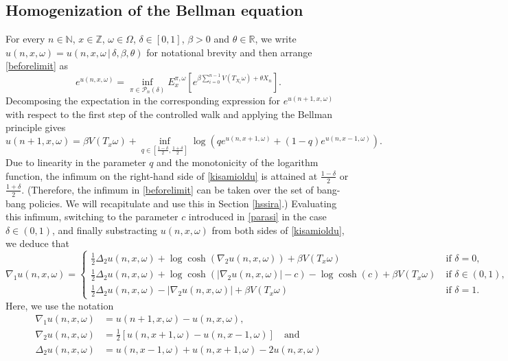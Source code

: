 \documentclass[a4paper]{amsart}
\numberwithin{equation}{section}
\theoremstyle{plain}
\theoremstyle{remark}
\begin{document}
\subsection{Homogenization of the Bellman equation}\label{homressec}

For every $n\in\mathbb{N}$, $x\in\mathbb{Z}$, $\omega\in\Omega$, $\delta\in[0,1]$, $\beta > 0$ and $\theta\in\mathbb{R}$, we write $u(n,x,\omega) = u(n,x,\omega\,|\,\delta,\beta,\theta)$ for notational brevity and then arrange \eqref{beforelimit} as
$$e^{u(n,x,\omega)} = \inf_{\pi\in\mathcal{P}_n(\delta)} E_x^{\pi,\omega}\left[e^{\beta\sum_{i=0}^{n-1}V(T_{X_i}\omega) + \theta X_n}\right].$$
Decomposing the expectation in the corresponding expression for $e^{u(n+1,x,\omega)}$ with respect to the first step of the controlled walk and applying the Bellman principle gives
\begin{equation}\label{kisamioldu}
u(n+1,x,\omega) = \beta V(T_x\omega) + \inf_{q\in[\frac{1-\delta}{2},\frac{1+\delta}{2}]}\log\left(q e^{u(n,x+1,\omega)} + (1-q)e^{u(n,x-1,\omega)}\right).
\end{equation}
Due to linearity in the parameter $q$ and the monotonicity of the logarithm function, the infimum on the right-hand side of \eqref{kisamioldu} is attained at $\frac{1 - \delta}{2}$ or $\frac{1 + \delta}{2}$. (Therefore, the infimum in \eqref{beforelimit} can be taken over the set of bang-bang policies. We will recapitulate and use this in Section \ref{hssira}.) Evaluating this infimum, switching to the parameter $c$ introduced in \eqref{parasi} in the case $\delta\in(0,1)$, and finally substracting $u(n,x,\omega)$ from both sides of \eqref{kisamioldu}, we deduce that
\begin{equation}\label{oriHJ2}
\nabla_1 u(n,x,\omega) = \begin{cases}
\frac1{2}\Delta_2 u(n,x,\omega) + \log\cosh(\nabla_2 u(n,x,\omega)) + \beta V(T_x\omega)&\ \text{if $\delta = 0$,}\\
\frac1{2}\Delta_2 u(n,x,\omega) + \log\cosh(|\nabla_2 u(n,x,\omega)| - c) - \log\cosh(c) + \beta V(T_x\omega)&\ \text{if $\delta\in(0,1)$,}\\
\frac1{2}\Delta_2 u(n,x,\omega) - |\nabla_2 u(n,x,\omega)| + \beta V(T_x\omega)&\ \text{if $\delta = 1$.}\end{cases}
\end{equation}
Here, we use the notation
\begin{align*}
\nabla_1 u(n,x,\omega) &= u(n+1,x,\omega) - u(n,x,\omega),\\
\nabla_2 u(n,x,\omega) &= \frac1{2}[u(n,x+1,\omega) - u(n,x-1,\omega)]\quad\text{and}\\
\Delta_2 u(n,x,\omega) &= u(n,x-1,\omega) + u(n,x+1,\omega) - 2u(n,x,\omega)
\end{align*}
\end{document}
